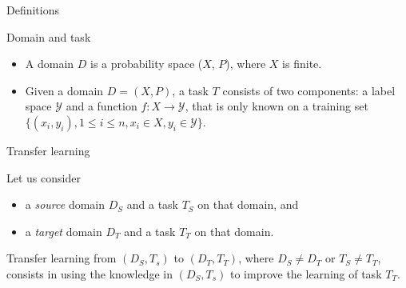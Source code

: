 \documentclass[xcolor=pdftex,dvipsnames,table,mathserif]{beamer}
\begin{document}
\begin{frame}{Definitions \cite{pan_survey_2010}}

\begin{block}{Domain and task}

\begin{itemize}
\item A domain $D$ is a probability space ($X$, $P$), where $X$ is finite.

\item Given a domain $D = (X, P)$, a task $T$ consists
of two components: a label space $\mathcal{Y}$ and a
function $f: X \rightarrow \mathcal{Y}$, that is only known on a training set
$\{(x_i, y_i), 1 \leq i \leq n, x_i \in X,  y_i \in \mathcal{Y}\}$.

\end{itemize}

\end{block}

\pause

\begin{block}{Transfer learning}

  Let us consider

  \begin{itemize}
  \item a \emph{source} domain $D_S$ and a task $T_S$ on that domain, and
  \item a \emph{target} domain $D_T$ and a task $T_T$ on that domain.
  \end{itemize}

Transfer learning from $(D_S, T_s)$ to $(D_T, T_T)$, where $D_S \neq D_T$ or $T_S \neq T_T$,  consists in using the knowledge in $(D_S, T_s)$ to improve the learning of task $T_T$.

\end{block}


\end{frame}
\end{document}
